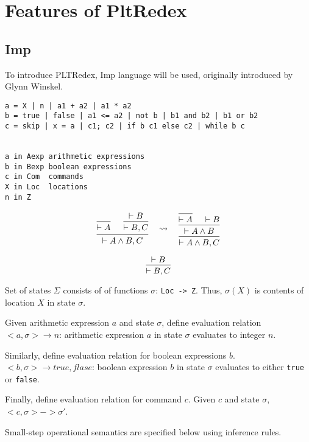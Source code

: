 \chapter{Features of PltRedex}

\section{Imp}

To introduce PLTRedex, Imp language will be used, originally introduced by Glynn Winskel.

\begin{lstlisting}
a = X | n | a1 + a2 | a1 * a2
b = true | false | a1 <= a2 | not b | b1 and b2 | b1 or b2
c = skip | x = a | c1; c2 | if b c1 else c2 | while b c


a in Aexp arithmetic expressions
b in Bexp boolean expressions
c in Com  commands 
X in Loc  locations
n in Z
\end{lstlisting}

\[\begin{prooftree}\infer0{ \vdash A }\hypo{ \vdash B } \infer1{ \vdash B, C }\infer2{ \vdash A\wedge B, C }\end{prooftree}\quad \rightsquigarrow \quad\begin{prooftree}\infer0{ \vdash A } \hypo{ \vdash B }\infer2{ \vdash A\wedge B }\infer1{ \vdash A\wedge B, C }\end{prooftree} 
\]

\[ 
\begin{prooftree}
\hypo{ \vdash B } \infer1{ \vdash B, C }
\end{prooftree}
\]

Set of states $\Sigma$ consists of of functions $\sigma$: \texttt{Loc -> Z}. Thus, $\sigma(X)$ is contents of location $X$ in state $\sigma$. 

Given arithmetic expression $a$ and state $\sigma$, define evaluation relation $<a,\sigma> \rightarrow n$: arithmetic expression $a$ in state $\sigma$ evaluates to integer $n$.

Similarly, define evaluation relation for boolean expressions $b$. $<b, \sigma> \rightarrow {true, flase}$: boolean expression $b$ in state $\sigma$ evaluates to either \texttt{true} or \texttt{false}.

Finally, define evaluation relation for command $c$. Given $c$ and state $\sigma$, $<c, \sigma> -> \sigma\prime$. 

Small-step operational semantics are specified below using inference rules.

